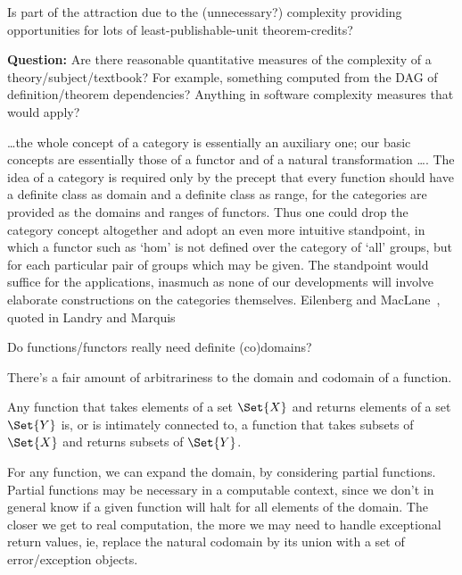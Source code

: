 \documentclass[11pt,openany]{book}
\begin{document}
Is part of the attraction due to the (unnecessary?)
complexity providing opportunities for lots of
least-publishable-unit 
theorem-credits?~\cite{JaffeQuinn:1993:TheoreticalMath,Thurston:1994:Proof}

\textbf{Question:} Are there reasonable quantitative measures
of the complexity of a theory/subject/textbook?
For example, something computed from the DAG of
definition/theorem dependencies?
Anything in software complexity measures that would apply?

\label{sec:arrow-more-general}

\begin{boxquote}
\ldots the whole concept of a category is essentially 
an auxiliary
one; our basic concepts are essentially those of a functor and of
a natural transformation {\ldots}. 
The idea of a category is required
only by the precept that every function should have a definite
class as domain and a definite class as range, for the categories
are provided as the domains and ranges of functors. Thus one
could drop the category concept altogether and adopt an even
more intuitive standpoint, in which a functor such as ‘hom’ is
not defined over the category of ‘all’ groups, 
but for each particular
pair of groups which may be given. The standpoint would
suffice for the applications, inasmuch as none of our developments
will involve elaborate constructions on the categories
themselves.
\tcblower
{Eilenberg and 
MacLane~\cite[p~247]{EilenberMaclane:1945:Equivalences},
quoted in Landry and 
Marquis~\cite[p~3]{LandryMarquis:2005:CatTheoryContext}}
\end{boxquote}

Do functions/functors really need definite (co)domains?

There's a fair amount of arbitrariness 
to the domain and codomain of a function.

Any function that takes elements of a set $\Set{X}$
and returns elements of a set $\Set{Y}$
is, or is intimately connected to, 
a function that takes subsets of $\Set{X}$ and returns
subsets of $\Set{Y}$.

For any function, we can expand the domain, by considering partial
functions. 
Partial functions may be necessary in a computable context,
since we don't in general know if a given function will
halt for all elements of the domain.
The closer we get to real computation, the more we may need to
handle exceptional return values, ie, replace the natural
codomain by its union with a set of error/exception objects.
\end{document}
